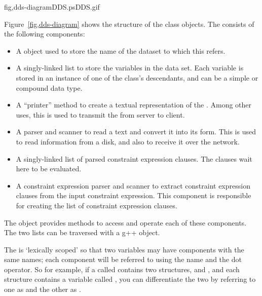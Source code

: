 {fig,dds-diagram}{DDS.ps}{DDS.gif}{}

Figure~\ref{fig,dds-diagram} shows the structure of the 
class objects. The  consists of the following components:

\begin{itemize}
  
\item A  object used to store the name of the dataset to
  which this  refers.

\item A singly-linked list to store the variables in the data set.
  Each variable is stored in an instance of one of the
   class's descendants, and can be a simple or
  compound data type.

\item A ``printer'' method to create a textual representation of the
  . Among other uses, this is used to transmit the
   from server to client.
  
\item A parser and scanner to read a text  and convert it
  into its \Cpp form.  This is used to read  information
  from a disk, and also to receive it over the network.
  
\item A singly-linked list of parsed constraint expression clauses.
  The clauses wait here to be evaluated.
  
\item A constraint expression parser and scanner to extract constraint
  expression clauses from the input constraint expression.  This
  component is responsible for creating the list of constraint
  expression clauses.

\end{itemize}

The  object provides methods to access and operate each of
these components.  The two lists can be traversed with a g++
 object.

The  is `lexically scoped' so that two 
variables may have components with the same names; each component will
be referred to using the  name and the dot operator.
So for example, if a  called  contains two
structures,  and , and each structure
contains a variable called , you can differentiate the two by
referring to one as  and the other as
.

